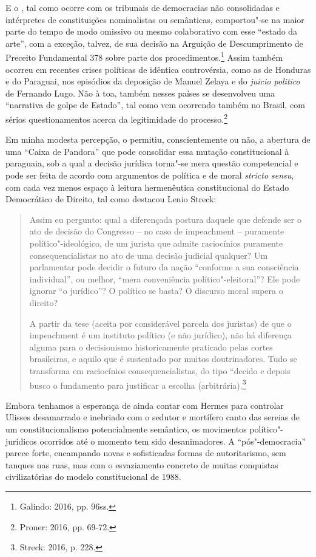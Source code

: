 E o , tal como ocorre com os tribunais de democracias não
consolidadas e intérpretes de constituições nominalistas ou semânticas,
comportou"-se na maior parte do tempo de modo omissivo ou mesmo
colaborativo com esse ``estado da arte'', com a exceção, talvez, de sua
decisão na Arguição de Descumprimento de Preceito Fundamental 378 sobre
parte dos procedimentos.\footnote{Galindo: 2016, pp. 96ss.} Assim também ocorreu
em recentes crises políticas de idêntica controvérsia, como as de
Honduras e do Paraguai, nos episódios da deposição de Manuel Zelaya e do
\emph{juicio politico} de Fernando Lugo. Não à toa, também nesses países
se desenvolveu uma ``narrativa de golpe de Estado'', tal como vem
ocorrendo também no Brasil, com sérios questionamentos acerca da
legitimidade do processo.\footnote{Proner: 2016, pp. 69-72.}

Em minha modesta percepção, o  permitiu, conscientemente ou não, a
abertura de uma ``Caixa de Pandora'' que pode consolidar essa mutação
constitucional à paraguaia, sob a qual a decisão jurídica torna"-se mera
questão competencial e pode ser feita de acordo com argumentos de
política e de moral \emph{stricto sensu}, com cada vez menos espaço à
leitura hermenêutica constitucional do Estado Democrático de Direito,
tal como destacou Lenio Streck:

\begin{quote}
Assim eu pergunto: qual a diferençada postura daquele que defende ser o
ato de decisão do Congresso -- no caso de impeachment --
puramente político"-ideológico, de um jurista que admite raciocínios
puramente consequencialistas no ato de uma decisão judicial qualquer? Um
parlamentar pode decidir o futuro da nação ``conforme a sua consciência
individual'', ou melhor, ``mera conveniência político"-eleitoral''? Ele
pode ignorar ``o jurídico''? O político se basta? O discurso moral
supera o direito?

A partir da tese (aceita por considerável parcela dos juristas) de que o
impeachment é um instituto político (e não jurídico), não há
diferença alguma para o decisionismo historicamente praticado pelas
cortes brasileiras, e aquilo que é sustentado por muitos doutrinadores.
Tudo se transforma em raciocínios consequencialistas, do tipo ``decido e
depois busco o fundamento para justificar a escolha (arbitrária).\footnote{Streck: 2016, p. 228.}
\end{quote}

Embora tenhamos a esperança de ainda contar com Hermes para controlar
Ulisses desamarrado e inebriado com o sedutor e mortífero canto das
sereias de um constitucionalismo potencialmente semântico, os movimentos
político"-jurídicos ocorridos até o momento tem sido desanimadores. A
``pós"-democracia'' parece forte, encampando novas e sofisticadas formas
de autoritarismo, sem tanques nas ruas, mas com o esvaziamento concreto
de muitas conquistas civilizatórias do modelo constitucional de 1988.

